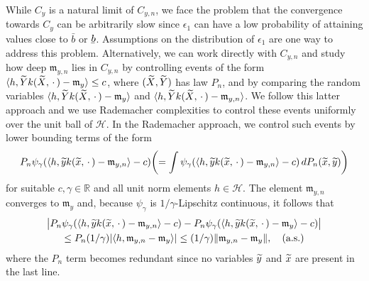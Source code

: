 \documentclass[10pt]{amsart}
\theoremstyle{definition}\newtheorem{defi}[theo]{Definition}\newtheorem{rema}[theo]{Remark}\newtheorem{exam}[theo]{Example}\newtheorem{exem}[theo]{Example}\newtheorem{nota}[theo]{Notation}
\theoremstyle{remark}
\newcommand{\R}{\mathbb{R}}
\newcommand{\cH}{\mathcal{H}}
\newcommand{\mean}{\mathfrak{m}}
\newcommand{\ubar}[1]{\underaccent{\bar}{#1}}
\let\oldtilde\tilde
\renewcommand*{\tilde}[1]{\mathchoice{\widetilde{#1}}{\widetilde{#1}}{\oldtilde{#1}}{\oldtilde{#1}}}
\let\originalleft\left
\let\originalright\right
\renewcommand{\left}{\mathopen{}\mathclose\bgroup\originalleft}
\renewcommand{\right}{\aftergroup\egroup\originalright}
\begin{document}
While $C_y$ is a natural limit of $C_{y,n}$, we face the problem that the convergence towards $C_y$ can be arbitrarily slow since $\epsilon_1$ can have a low probability of attaining values close to $\bar b$ or $\ubar{b}$. Assumptions on the distribution of $\epsilon_1$ are one way to address this problem. Alternatively, we can work directly with $C_{y,n}$ and study how deep $\mean_{y,n}$ lies in $C_{y,n}$ by controlling events of the form $ \langle h, \tilde Y k(\tilde X,\,\cdot\,) - \mean_y \rangle \leq c $, where $(\tilde X,\tilde Y)$ has law $P_n$, and by comparing the random variables $\langle h, \tilde Y k(\tilde X,\,\cdot\,) - \mean_y \rangle$ and $\langle h, \tilde Y k(\tilde X,\,\cdot\,) - \mean_{y,n} \rangle$. We follow this latter approach and we use Rademacher complexities to control these events uniformly over the unit ball of $\cH$. In the Rademacher approach, we control such events by lower bounding terms of the form
\begin{equation*}
P_n \psi_\gamma(\langle h, \tilde y k(\tilde x,\,\cdot\,) - \mean_{y,n} \rangle - c) \left(= \int \psi_\gamma(\langle h, \tilde y k(\tilde x,\,\cdot\,) - \mean_{y,n} \rangle - c) \,dP_n(\tilde x,\tilde y) \right)
\end{equation*}
for suitable $c,\gamma \in \R$ and all unit norm elements $h\in \cH$. The element $\mean_{y,n}$ converges to $\mean_y$ and, because $\psi_\gamma$ is $1/\gamma$-Lipschitz continuous, it follows that
\begin{multline}\label{eq:lip_to_mean}
\bigl|P_n \psi_\gamma(\langle h, \tilde y k(\tilde x,\,\cdot\,) - \mean_{y,n} \rangle - c) - P_n \psi_\gamma(\langle h, \tilde y k(\tilde x,\,\cdot\,) - \mean_{y} \rangle - c)\bigr|  \\
\leq P_n (1/\gamma) | \langle h, \mean_{y,n} - \mean_y \rangle| \leq (1/\gamma) \|\mean_{y,n} - \mean_y\|, \text{\quad (a.s.)} 
\end{multline}
where the $P_n$ term becomes redundant since no variables $\tilde y$ and $\tilde x$ are present in the last line.
\end{document}
